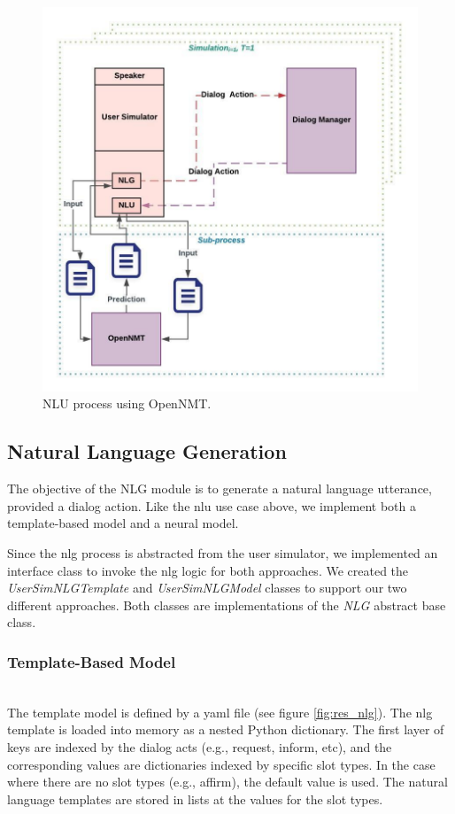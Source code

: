 \begin{figure}[h!]
	\centering
	\includegraphics[scale=.65]{diagrams/open_nmt.jpeg}
	\caption{ NLU process using OpenNMT. }
	\label{fig:open_nmt_model}
\end{figure}


\subsection{Natural Language Generation}

The objective of the NLG module is to generate a natural language utterance, provided a dialog action. Like the nlu use case above, we implement both a template-based model and a neural model. 

Since the nlg process is abstracted from the user simulator, we implemented an interface class to invoke the nlg logic for both approaches. We created the \textit{UserSimNLGTemplate} and \textit{UserSimNLGModel} classes to support our two different approaches. Both classes are implementations of the \textit{NLG} abstract base class.


\subsubsection{Template-Based Model}
~ \\ 
The template model is defined by a yaml file (see figure \ref{fig:res_nlg}). The nlg template is loaded into memory as a nested Python dictionary. The first layer of keys are indexed by the dialog acts (e.g., request, inform, etc), and the corresponding values are dictionaries indexed by specific slot types. In the case where there are no slot types (e.g., affirm), the default value is used. The natural language templates are stored in lists at the values for the slot types.

